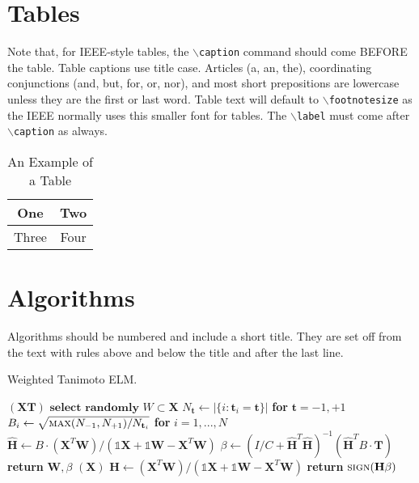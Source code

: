 \documentclass[lettersize,journal]{IEEEtran}
\begin{document}
\section{Tables}
Note that, for IEEE-style tables, the
 $\backslash${\tt{caption}} command should come BEFORE the table. Table captions use title case. Articles (a, an, the), coordinating conjunctions (and, but, for, or, nor), and most short prepositions are lowercase unless they are the first or last word. Table text will default to $\backslash${\tt{footnotesize}} as
 the IEEE normally uses this smaller font for tables.
 The $\backslash${\tt{label}} must come after $\backslash${\tt{caption}} as always.
 
\begin{table}[!t]
\caption{An Example of a Table\label{tab:table1}}
\centering
\begin{tabular}{|c||c|}
\hline
One & Two\\
\hline
Three & Four\\
\hline
\end{tabular}
\end{table}

\section{Algorithms}
Algorithms should be numbered and include a short title. They are set off from the text with rules above and below the title and after the last line.

\begin{algorithm}[H]
\caption{Weighted Tanimoto ELM.}\label{alg:alg1}
\begin{algorithmic}
\STATE 
{}$(\mathbf{X} \mathbf{T})$
\STATE \hspace{0.5cm}$ \textbf{select randomly } W \subset \mathbf{X}  $
\STATE \hspace{0.5cm}$ N_\mathbf{t} \gets | \{ i : \mathbf{t}_i = \mathbf{t} \} | $ \textbf{ for } $ \mathbf{t}= -1,+1 $
\STATE \hspace{0.5cm}$ B_i \gets \sqrt{ \textsc{max}(N_{-1},N_{+1}) / N_{\mathbf{t}_i} } $ \textbf{ for } $ i = 1,...,N $
\STATE \hspace{0.5cm}$ \hat{\mathbf{H}} \gets  B \cdot (\mathbf{X}^T\textbf{W})/( \mathbb{1}\mathbf{X} + \mathbb{1}\textbf{W} - \mathbf{X}^T\textbf{W} ) $
\STATE \hspace{0.5cm}$ \beta \gets \left ( I/C + \hat{\mathbf{H}}^T\hat{\mathbf{H}} \right )^{-1}(\hat{\mathbf{H}}^T B\cdot \mathbf{T})  $
\STATE \hspace{0.5cm}\textbf{return}  $\textbf{W},  \beta $
\STATE 
{}$(\mathbf{X} )$
\STATE \hspace{0.5cm}$ \mathbf{H} \gets  (\mathbf{X}^T\textbf{W} )/( \mathbb{1}\mathbf{X}  + \mathbb{1}\textbf{W}- \mathbf{X}^T\textbf{W}  ) $
\STATE \hspace{0.5cm}\textbf{return}  $\textsc{sign}( \mathbf{H} \beta )$
\end{algorithmic}
\label{alg1}
\end{algorithm}
\end{document}
